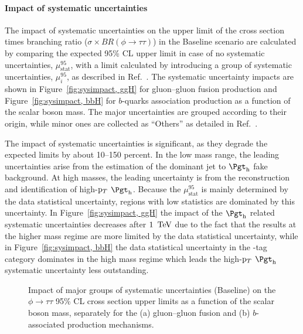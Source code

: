 \paragraph{Impact of systematic uncertainties}
The impact of systematic uncertainties on the upper limit of the cross section times branching ratio ($\sigma\times BR(\phi\to\tau\tau)$) in the Baseline scenario are calculated by comparing the expected 95\% CL upper limit in case of no systematic uncertainties, $\mu^{95}_{\text{stat}}$, with a limit calculated by introducing a group of systematic uncertainties, $\mu^{95}_i$, as described in Ref.~\cite{ATLASRun2Ditau}. The systematic uncertainty impacts are shown in Figure~\ref{fig:sysimpact, ggH} for gluon--gluon fusion production and Figure~\ref{fig:sysimpact, bbH} for $b$-quarks association production as a function of the scalar boson mass. The major uncertainties are grouped according to their origin, while minor ones are collected as ``Others'' as detailed in Ref.~\cite{ATLASRun2Ditau}.

The impact of systematic uncertainties is significant, as they degrade the expected limits by about 10--150 percent. In the low mass range, the leading uncertainties arise from the estimation of the dominant jet to $\tauhad$ fake background. At high masses, the leading uncertainty is from the reconstruction and identification of high-$\mathrm{p}_{T}$ $\tauhad$. Because the $\mu^{95}_{\text{stat}}$ is mainly determined by the data statistical uncertainty, regions with low statistics are dominated by this uncertainty. In Figure~\ref{fig:sysimpact, ggH} the impact of the $\tauhad$ related systematic uncertainties decreases after $1~\,\text{Te\hspace{-.08em}V}$ due to the fact that the results at the higher mass regime are more limited by the data statistical uncertainty, while in Figure~\ref{fig:sysimpact, bbH} the data statistical uncertainty in the \PQb-tag category dominates in the high mass regime which leads the high-$\mathrm{p}_{T}$ $\tauhad$ systematic uncertainty less outstanding.

\begin{figure}[!ht]
    \centering
        \qquad
        \caption{Impact of major groups of systematic uncertainties (Baseline) on the $\phi\to\tau\tau$ 95\% CL cross section upper limits as a function of the scalar boson mass, separately for the (a) gluon--gluon fusion and (b) $b$-associated production mechanisms.}
    \label{fig:sysimpact}
\end{figure}

